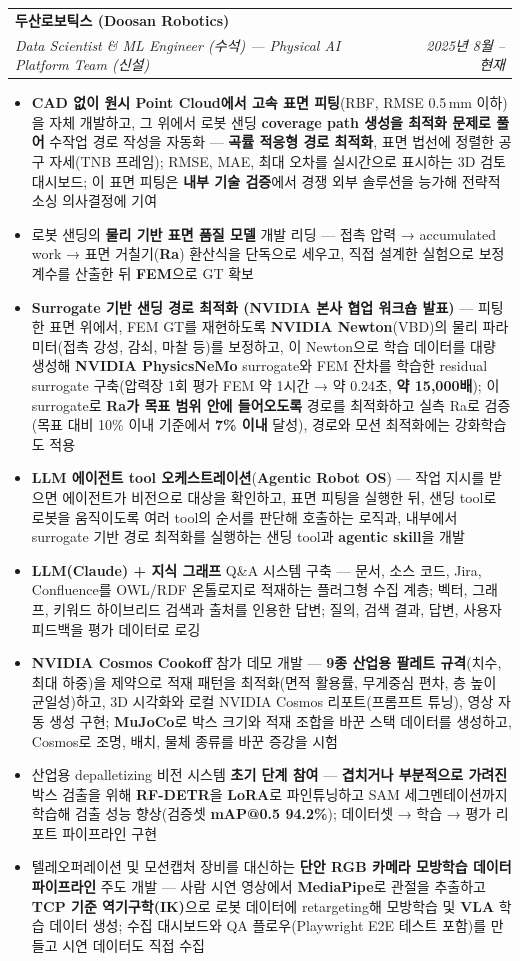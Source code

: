 \documentclass[a4paper,11pt]{article}
\makeatletter
\newcommand{\resumeItem}[1]{\item\small{{#1 \vspace{-2pt}}}}
\newcommand{\resumeSubheading}[4]{
  \vspace{-2pt}\item
    \begin{tabular*}{0.97\textwidth}[t]{l@{\extracolsep{\fill}}r}
      \textbf{#1} & #2 \\
      \textit{\small#3} & \textit{\small #4} \\
    \end{tabular*}\vspace{-7pt}
}
\newcommand{\resumeItemListStart}{\begin{itemize}[itemsep=0pt]}
\newcommand{\resumeItemListEnd}{\end{itemize}\vspace{-5pt}}
\makeatother
\begin{document}
    \resumeSubheading
      {두산로보틱스 (Doosan Robotics)}{}
      {Data Scientist \& ML Engineer (수석) --- Physical AI Platform Team (신설)}{2025년 8월 -- 현재}
      \resumeItemListStart
        \resumeItem{\textbf{CAD 없이 원시 Point Cloud에서 고속 표면 피팅}(RBF, RMSE 0.5\,mm 이하)을 자체 개발하고, 그 위에서 로봇 샌딩 \textbf{coverage path 생성을 최적화 문제로 풀어} 수작업 경로 작성을 자동화 --- \textbf{곡률 적응형 경로 최적화}, 표면 법선에 정렬한 공구 자세(TNB 프레임); RMSE, MAE, 최대 오차를 실시간으로 표시하는 3D 검토 대시보드; 이 표면 피팅은 \textbf{내부 기술 검증}에서 경쟁 외부 솔루션을 능가해 전략적 소싱 의사결정에 기여}
        \resumeItem{로봇 샌딩의 \textbf{물리 기반 표면 품질 모델} 개발 리딩 --- 접촉 압력 → accumulated work → 표면 거칠기(\textbf{Ra}) 환산식을 단독으로 세우고, 직접 설계한 실험으로 보정 계수를 산출한 뒤 \textbf{FEM}으로 GT 확보}
        \resumeItem{\textbf{Surrogate 기반 샌딩 경로 최적화 (NVIDIA 본사 협업 워크숍 발표)} --- 피팅한 표면 위에서, FEM GT를 재현하도록 \textbf{NVIDIA Newton}(VBD)의 물리 파라미터(접촉 강성, 감쇠, 마찰 등)를 보정하고, 이 Newton으로 학습 데이터를 대량 생성해 \textbf{NVIDIA PhysicsNeMo} surrogate와 FEM 잔차를 학습한 residual surrogate 구축(압력장 1회 평가 FEM 약 1시간 → 약 0.24초, \textbf{약 15,000배}); 이 surrogate로 \textbf{Ra가 목표 범위 안에 들어오도록} 경로를 최적화하고 실측 Ra로 검증(목표 대비 10\% 이내 기준에서 \textbf{7\% 이내} 달성), 경로와 모션 최적화에는 강화학습도 적용}
        \resumeItem{\textbf{LLM 에이전트 tool 오케스트레이션}(\textbf{Agentic Robot OS}) --- 작업 지시를 받으면 에이전트가 비전으로 대상을 확인하고, 표면 피팅을 실행한 뒤, 샌딩 tool로 로봇을 움직이도록 여러 tool의 순서를 판단해 호출하는 로직과, 내부에서 surrogate 기반 경로 최적화를 실행하는 샌딩 tool과 \textbf{agentic skill}을 개발}
        \resumeItem{\textbf{LLM(Claude) + 지식 그래프} Q\&A 시스템 구축 --- 문서, 소스 코드, Jira, Confluence를 OWL/RDF 온톨로지로 적재하는 플러그형 수집 계층; 벡터, 그래프, 키워드 하이브리드 검색과 출처를 인용한 답변; 질의, 검색 결과, 답변, 사용자 피드백을 평가 데이터로 로깅}
        \resumeItem{\textbf{NVIDIA Cosmos Cookoff} 참가 데모 개발 --- \textbf{9종 산업용 팔레트 규격}(치수, 최대 하중)을 제약으로 적재 패턴을 최적화(면적 활용률, 무게중심 편차, 층 높이 균일성)하고, 3D 시각화와 로컬 NVIDIA Cosmos 리포트(프롬프트 튜닝), 영상 자동 생성 구현; \textbf{MuJoCo}로 박스 크기와 적재 조합을 바꾼 스택 데이터를 생성하고, Cosmos로 조명, 배치, 물체 종류를 바꾼 증강을 시험}
        \resumeItem{산업용 depalletizing 비전 시스템 \textbf{초기 단계 참여} --- \textbf{겹치거나 부분적으로 가려진} 박스 검출을 위해 \textbf{RF-DETR}을 \textbf{LoRA}로 파인튜닝하고 SAM 세그멘테이션까지 학습해 검출 성능 향상(검증셋 \textbf{mAP@0.5 94.2\%}); 데이터셋 → 학습 → 평가 리포트 파이프라인 구현}
        \resumeItem{텔레오퍼레이션 및 모션캡처 장비를 대신하는 \textbf{단안 RGB 카메라 모방학습 데이터 파이프라인} 주도 개발 --- 사람 시연 영상에서 \textbf{MediaPipe}로 관절을 추출하고 \textbf{TCP 기준 역기구학(IK)}으로 로봇 데이터에 retargeting해 모방학습 및 \textbf{VLA} 학습 데이터 생성; 수집 대시보드와 QA 플로우(Playwright E2E 테스트 포함)를 만들고 시연 데이터도 직접 수집}
      \resumeItemListEnd
\end{document}
